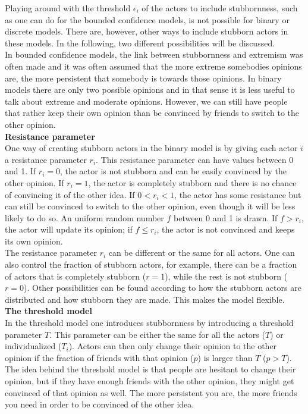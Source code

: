 \documentclass[11 pt , letterpaper , twoside , openright]{book}
\begin{document}
Playing around with the threshold $\epsilon_i$ of the actors to include stubbornness, such as one can do for the bounded confidence models, is not possible for binary or discrete models. There are, however, other ways to include stubborn actors in these models. In the following, two different possibilities will be discussed. \\
\newline
In bounded confidence models, the link between stubbornness and extremism was often made and it was often assumed that the more extreme somebodies opinions are, the more persistent that somebody is towards those opinions. In binary models there are only two possible opinions and in that sense it is less useful to talk about extreme and moderate opinions. However, we can still have people that rather keep their own opinion than be convinced by friends to switch to the other opinion.\\
\newline
\textbf{Resistance parameter}\\
\newline
One way of creating stubborn actors in the binary model is by giving each actor $i$ a resistance parameter $r_i$. This resistance parameter can have values between 0 and 1. If $r_i = 0$, the actor is not stubborn and can be easily convinced by the other opinion. If $r_i = 1$, the actor is completely stubborn and there is no chance of convincing it of the other idea. If $0 < r_i < 1$, the actor has some resistance but can still be convinced to switch to the other opinion, even though it will be less likely to do so. An uniform random number $f$ between 0 and 1 is drawn. If $f > r_i$, the actor will update its opinion; if $f \leqslant r_i$, the actor is not convinced and keeps its own opinion.\\
\newline
The resistance parameter $r_i$ can be different or the same for all actors. One can also control the fraction of stubborn actors, for example, there can be a fraction of actors that is completely stubborn ($r = 1$), while the rest is not stubborn ($r = 0$). Other possibilities can be found according to how the stubborn actors are distributed and how stubborn they are made. This makes the model flexible.\\
\newline
\textbf{The threshold model}\\
\newline
In the threshold model one introduces stubbornness by introducing a threshold parameter $T$. This parameter can be either the same for all the actors ($T$) or individualized ($T_i$). Actors can then only change their opinion to the other opinion if the fraction of friends with that opinion ($p$) is larger than $T$ ($p > T$). The idea behind the threshold model is that people are hesitant to change their opinion, but if they have enough friends with the other opinion, they might get convinced of that opinion as well. The more persistent you are, the more friends you need in order to be convinced of the other idea. \\
\end{document}
